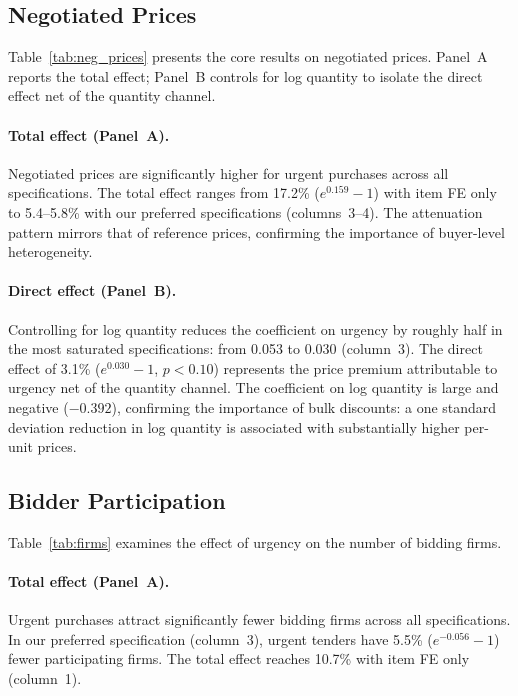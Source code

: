 \subsection{Negotiated Prices}
\label{sec:neg_prices}

Table~\ref{tab:neg_prices} presents the core results on negotiated prices. Panel~A reports the total effect; Panel~B controls for log quantity to isolate the direct effect net of the quantity channel.



\paragraph{Total effect (Panel~A).}
Negotiated prices are significantly higher for urgent purchases across all specifications. The total effect ranges from 17.2\% ($e^{0.159}-1$) with item FE only to 5.4--5.8\% with our preferred specifications (columns~3--4). The attenuation pattern mirrors that of reference prices, confirming the importance of buyer-level heterogeneity.

\paragraph{Direct effect (Panel~B).}
Controlling for log quantity reduces the coefficient on urgency by roughly half in the most saturated specifications: from 0.053 to 0.030 (column~3). The direct effect of 3.1\% ($e^{0.030}-1$, $p < 0.10$) represents the price premium attributable to urgency net of the quantity channel. The coefficient on log quantity is large and negative ($-0.392$), confirming the importance of bulk discounts: a one standard deviation reduction in log quantity is associated with substantially higher per-unit prices.

\subsection{Bidder Participation}
\label{sec:firms}

Table~\ref{tab:firms} examines the effect of urgency on the number of bidding firms.



\paragraph{Total effect (Panel~A).}
Urgent purchases attract significantly fewer bidding firms across all specifications. In our preferred specification (column~3), urgent tenders have 5.5\% ($e^{-0.056}-1$) fewer participating firms. The total effect reaches 10.7\% with item FE only (column~1).

